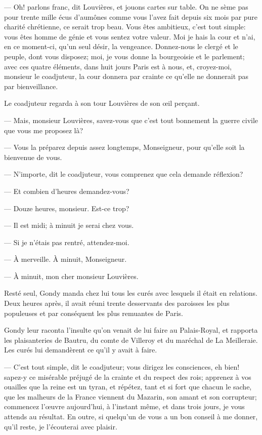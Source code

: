 — Oh! parlons franc, dit Louvières, et jouons cartes sur table. On ne sème pas pour trente mille écus d'aumônes comme vous l'avez fait depuis six mois par pure charité chrétienne, ce serait trop beau. Vous êtes ambitieux, c'est tout simple: vous êtes homme de génie et vous sentez votre valeur. Moi je hais la cour et n'ai, en ce moment-ci, qu'un seul désir, la vengeance. Donnez-nous le clergé et le peuple, dont vous disposez; moi, je vous donne la bourgeoisie et le parlement; avec ces quatre éléments, dans huit jours Paris est à nous, et, croyez-moi, monsieur le coadjuteur, la cour donnera par crainte ce qu'elle ne donnerait pas par bienveillance.

Le coadjuteur regarda à son tour Louvières de son œil perçant.

— Mais, monsieur Louvières, savez-vous que c'est tout bonnement la guerre civile que vous me proposez là?

— Vous la préparez depuis assez longtemps, Monseigneur, pour qu'elle soit la bienvenue de vous.

— N'importe, dit le coadjuteur, vous comprenez que cela demande réflexion?

— Et combien d'heures demandez-vous?

— Douze heures, monsieur. Est-ce trop?

— Il est midi; à minuit je serai chez vous.

— Si je n'étais pas rentré, attendez-moi.

— À merveille. À minuit, Monseigneur.

— À minuit, mon cher monsieur Louvières.

Resté seul, Gondy manda chez lui tous les curés avec lesquels il était en relations. Deux heures après, il avait réuni trente desservants des paroisses les plus populeuses et par conséquent les plus remuantes de Paris.

Gondy leur raconta l'insulte qu'on venait de lui faire au Palais-Royal, et rapporta les plaisanteries de Bautru, du comte de Villeroy et du maréchal de La Meilleraie. Les curés lui demandèrent ce qu'il y avait à faire.

— C'est tout simple, dit le coadjuteur; vous dirigez les consciences, eh bien! sapez-y ce misérable préjugé de la crainte et du respect des rois; apprenez à vos ouailles que la reine est un tyran, et répétez, tant et si fort que chacun le sache, que les malheurs de la France viennent du Mazarin, son amant et son corrupteur; commencez l'œuvre aujourd'hui, à l'instant même, et dans trois jours, je vous attends au résultat. En outre, si quelqu'un de vous a un bon conseil à me donner, qu'il reste, je l'écouterai avec plaisir.

